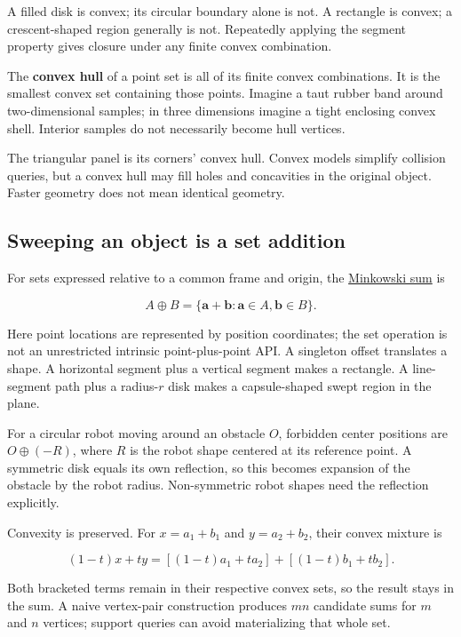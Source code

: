 A filled disk is convex; its circular boundary alone is not. A rectangle is convex; a crescent-shaped region generally is not. Repeatedly applying the segment property gives closure under any finite convex combination.

The \textbf{convex hull} of a point set is all of its finite convex combinations. It is the smallest convex set containing those points. Imagine a taut rubber band around two-dimensional samples; in three dimensions imagine a tight enclosing convex shell. Interior samples do not necessarily become hull vertices.

The triangular panel is its corners' convex hull. Convex models simplify collision queries, but a convex hull may fill holes and concavities in the original object. Faster geometry does not mean identical geometry.

\subsection{Sweeping an object is a set addition}\label{01-foundations-i-ch018-sweeping-an-object-is-a-set-addition}

For sets expressed relative to a common frame and origin, the \hyperref[01-foundations-i-ch018-weighted-points-lead-from-affine-geometry-to-collision-shapes]{Minkowski sum} is

\[
A\oplus B=\{\mathbf a+\mathbf b:\mathbf a\in A,\mathbf b\in B\}.
\]

Here point locations are represented by position coordinates; the set operation is not an unrestricted intrinsic point-plus-point API. A singleton offset translates a shape. A horizontal segment plus a vertical segment makes a rectangle. A line-segment path plus a radius-\(r\) disk makes a capsule-shaped swept region in the plane.

For a circular robot moving around an obstacle \(O\), forbidden center positions are \(O\oplus(-R)\), where \(R\) is the robot shape centered at its reference point. A symmetric disk equals its own reflection, so this becomes expansion of the obstacle by the robot radius. Non-symmetric robot shapes need the reflection explicitly.

Convexity is preserved. For \(x=a_1+b_1\) and \(y=a_2+b_2\), their convex mixture is

\[
(1-t)x+ty=[(1-t)a_1+ta_2]+[(1-t)b_1+tb_2].
\]

Both bracketed terms remain in their respective convex sets, so the result stays in the sum. A naive vertex-pair construction produces \(mn\) candidate sums for \(m\) and \(n\) vertices; support queries can avoid materializing that whole set.

